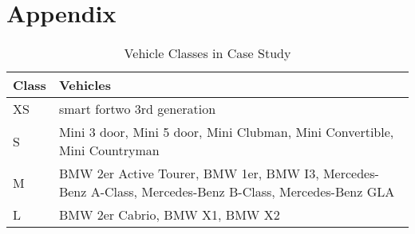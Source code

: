 \clearpage
\section{Appendix}
\label{app:A}

\begin{longtable}{ | l | p{12cm} |}
  \caption{Vehicle Classes in Case Study}
  \label{table:VehicleClasses}
  \\
  \hline
  \textbf{Class} & \textbf{Vehicles} \\
  \hline
  XS & smart fortwo 3rd generation \\
  S & Mini 3 door, Mini 5 door, Mini Clubman, Mini Convertible,  Mini Countryman \\
  M & BMW 2er Active Tourer, BMW 1er, BMW I3, Mercedes-Benz A-Class, Mercedes-Benz B-Class, Mercedes-Benz GLA \\
  L & BMW 2er Cabrio, BMW X1, BMW X2 \\
  \hline
\end{longtable}
